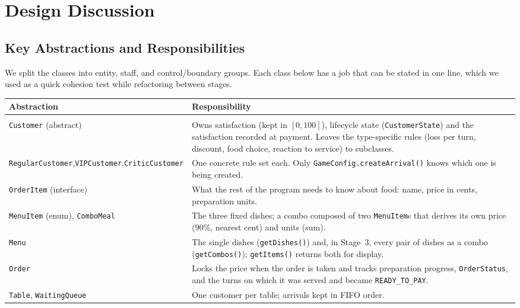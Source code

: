 \section{Design Discussion}
\sloppy

\subsection{Key Abstractions and Responsibilities}

We split the classes into entity, staff, and control/boundary groups. Each class below has a job that can be stated in one line, which we used as a quick cohesion test while refactoring between stages.

\begin{table}[H]
\centering
\small
\begin{tabularx}{\textwidth}{>{\raggedright\arraybackslash}p{3.6cm}X}
\toprule
\textbf{Abstraction} & \textbf{Responsibility} \\
\midrule
\multicolumn{2}{l}{\textit{Entity}} \\
\texttt{Customer} (abstract) & Owns satisfaction (kept in $[0,100]$), lifecycle state (\texttt{CustomerState}) and the satisfaction recorded at payment. Leaves the type-specific rules (loss per turn, discount, food choice, reaction to service) to subclasses. \\
\texttt{RegularCustomer},\newline \texttt{VIPCustomer},\newline \texttt{CriticCustomer} & One concrete rule set each. Only \texttt{GameConfig.createArrival()} knows which one is being created. \\
\texttt{OrderItem} (interface) & What the rest of the program needs to know about food: name, price in cents, preparation units. \\
\texttt{MenuItem} (enum), \texttt{ComboMeal} & The three fixed dishes; a combo composed of two \texttt{MenuItem}s that derives its own price (90\%, nearest cent) and units (sum). \\
\texttt{Menu} & The single dishes (\texttt{getDishes()}) and, in Stage~3, every pair of dishes as a combo (\texttt{getCombos()}); \texttt{getItems()} returns both for display. \\
\texttt{Order} & Locks the price when the order is taken and tracks preparation progress, \texttt{OrderStatus}, and the turns on which it was served and became \texttt{READY\_TO\_PAY}. \\
\texttt{Table}, \texttt{WaitingQueue} & One customer per table; arrivals kept in FIFO order. \\

\end{tabularx}
\end{table}
